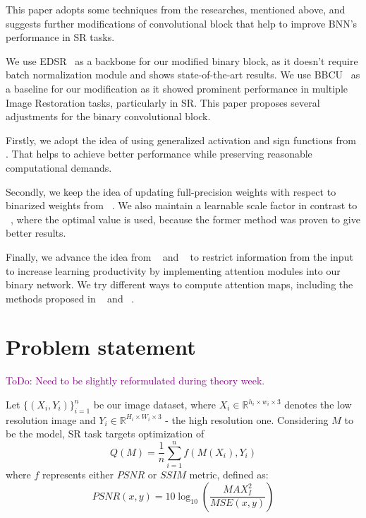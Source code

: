 \documentclass{article}
\newcommand{\TODO}[1]{\textcolor{purple}{ToDo: #1.}}
\begin{document}
This paper adopts some techniques from the researches, mentioned above, and suggests further modifications of convolutional block that help to improve BNN's performance in SR tasks.

We use EDSR~\cite{lim2017enhanced} as a backbone for our modified binary block, as it doesn't require batch normalization module and shows state-of-the-art results. We use BBCU~\cite{xia2022basic} as a baseline for our modification as it showed prominent performance in multiple Image Restoration tasks, particularly in SR. This paper proposes several adjustments for the binary convolutional block.

Firstly, we adopt the idea of using generalized activation and sign functions from \cite{liu2020reactnet}. That helps to achieve better performance while preserving reasonable computational demands. 

Secondly, we keep the idea of updating full-precision weights with respect to binarized weights from ~\cite{ma2019efficient}. We also maintain a learnable scale factor in contrast to ~\cite{xia2022basic}, where the optimal value is used, because the former method was proven to give better results.

Finally, we advance the idea from ~\cite{xue2022ir2net} and ~\cite{guo2022join} to restrict information from the input to increase learning productivity by implementing attention modules into our binary network. We try different ways to compute attention maps, including the methods proposed in ~\cite{zhao2020efficient} and ~\cite{hu2018squeeze}.

\section{Problem statement}
\label{sec:headings}

\TODO{Need to be slightly reformulated during theory week}

Let $\{(X_i, Y_i)\}_{i=1}^n$ be our image dataset, where $X_i \in \mathbb{R}^{h_i \times w_i \times 3}$ denotes the low resolution image and $Y_i \in \mathbb{R}^{H_i \times W_i \times 3}$ - the high resolution one. Considering $M$ to be the model, SR task targets optimization of 
\begin{equation}
    Q(M) = \frac{1}{n}\sum\limits_{i=1}^nf(M(X_i), Y_i)
\end{equation}
where $f$ represents either $PSNR$ or $SSIM$ metric, defined as:
\begin{equation}
    PSNR(x, y) = 10 \log_{10} \left(\frac{MAX_I^2}{MSE(x, y)}\right)
\end{equation}
\end{document}
